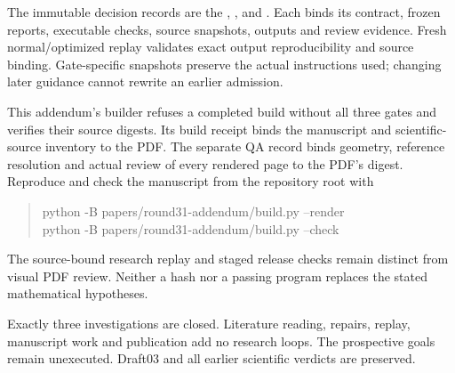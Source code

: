 The immutable decision records are the
,
, and
.
Each binds its contract, frozen reports, executable checks, source snapshots,
outputs and review evidence. Fresh normal/optimized replay validates exact
output reproducibility and source binding. Gate-specific snapshots preserve
the actual instructions used; changing later guidance cannot rewrite an
earlier admission.

This addendum's builder refuses a completed build without all three gates and
verifies their source digests. Its build receipt binds the manuscript and
scientific-source inventory to the PDF. The separate QA record binds geometry,
reference resolution and actual review of every rendered page to the PDF's
digest. Reproduce and check the manuscript from the repository root with
\begin{quote}\small\ttfamily
python -B papers/round31-addendum/build.py --render\\
python -B papers/round31-addendum/build.py --check
\end{quote}
The source-bound research replay and staged release checks remain distinct
from visual PDF review. Neither a hash nor a passing program replaces the
stated mathematical hypotheses.

Exactly three investigations are closed. Literature reading, repairs, replay,
manuscript work and publication add no research loops. The prospective goals
remain unexecuted. Draft03 and all earlier scientific verdicts are preserved.
